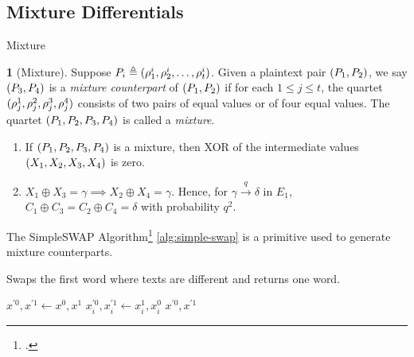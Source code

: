 \documentclass[notheorems]{beamer}
\theoremstyle{definition}
\newtheorem{definition}{\translate{Definition}}
\theoremstyle{example}
\begin{document}
    \subsection{Mixture Differentials}
    \label{subsec:mixture}
    
    \begin{frame}{Mixture}
        \begin{definition}[Mixture]
            \label{def:mixture}
            Suppose \(P_i \triangleq (\rho_1^i, \rho_2^i, \ldots,
            \rho_t^i)\). Given a plaintext pair \((P_1, P_2)\), we say
            \((P_3, P_4)\) is a \emph{mixture counterpart} of \((P_1,
            P_2)\) if for each \(1 \le j \le t\), the quartet \((\rho_j^1,
            \rho_j^2, \rho_j^3, \rho_j^4)\) consists of two pairs of equal
            values or of four equal values. The quartet \((P_1, P_2, P_3,
            P_4)\) is called a \emph{mixture}.
        \end{definition}
        \pause
        \begin{enumerate}
            \item<2-> If \((P_1, P_2, P_3, P_4)\) is a mixture, then XOR of
            the intermediate values \((X_1, X_2, X_3, X_4)\) is zero.
            \item<3-> \(X_1 \oplus X_3 = \gamma \implies X_2 \oplus X_4 =
            \gamma\). Hence, for \(\gamma \xrightarrow{q} \delta\) in \(E_1\),
            \(C_1 \oplus C_3 = C_2 \oplus C_4 = \delta\) with probability
            \(q^2\).
        \end{enumerate}
    \end{frame}

    \begin{frame}{The SimpleSWAP Algorithm\footcite{ronjomYoyoTricksAES2017}}
        \cref{alg:simple-swap} is a primitive used to generate mixture
        counterparts.
        \begin{algorithm}[H]
            \caption{Swaps the first word where texts are different and returns one word.}
            \label{alg:simple-swap}
            \begin{algorithmic}[1]
                 
                    \State \(x^{\prime 0}, x^{\prime 1} \gets x^0, x^1\)
                            \State \(x_i^{\prime 0}, x_i^{\prime 1} \gets x_i^1, x_i^0\)
                            \State \Return \(x^{\prime 0}, x^{\prime 1}\)
                        \EndIf
                    \EndFor
                \EndFunction
            \end{algorithmic}
        \end{algorithm}
    \end{frame}
\end{document}
